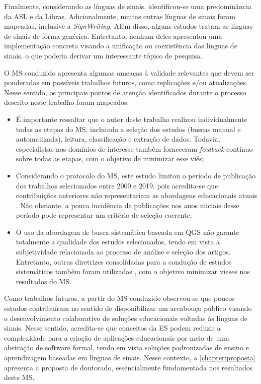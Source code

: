 Finalmente, considerando as línguas de sinais, identificou-se uma predominância da ASL e da Libras. Adicionalmente, muitas outras línguas de sinais foram mapeadas, inclusive a \textit{SignWriting}. Além disso, alguns estudos tratam as línguas de sinais de forma genérica. Entretanto, nenhum deles apresentou uma implementação concreta visando a unificação ou coexistência das línguas de sinais, o que poderia derivar um interessante tópico de pesquisa.

O MS conduzido apresenta algumas ameaças à validade relevantes que devem ser ponderadas em possíveis trabalhos futuros, como replicações e/ou atualizações. Nesse sentido, os principais pontos de atenção identificados durante o processo descrito neste trabalho foram mapeados:

\begin{itemize}
\item É importante ressaltar que o autor deste trabalho realizou individualmente todas as etapas do MS, incluindo a seleção dos estudos (buscas manual e automatizada), leitura, classificação e extração de dados. Todavia, especialistas nos domínios de interesse também forneceram \textit{feedback} contínuo sobre todas as etapas, com o objetivo de minimizar esse viés; 
\item Considerando o protocolo do MS, este estudo limitou o período de publicação dos trabalhos selecionados entre 2000 e 2019, pois acredita-se que contribuições anteriores não representariam as abordagens educacionais atuais \cite{Radermacher2013,Scatalon2019}. Não obstante, a pouca incidência de publicações nos anos iniciais desse período pode representar um critério de seleção coerente.
\item O uso da abordagem de busca sistemática baseada em QGS \cite{Zhang2011} não garante totalmente a qualidade dos estudos selecionados, tendo em vista a subjetividade relacionada ao processo de análise e seleção dos artigos. Entretanto, outras diretrizes consolidadas para a condução de estudos sistemáticos também foram utilizadas \cite{Kitchenham2007,Petersen2015}, com o objetivo minimizar vieses nos resultados do MS.
\end{itemize}

Como trabalhos futuros, a partir do MS conduzido observou-se que poucos estudos contribuíram no sentido de disponibilizar um arcabouço público visando o desenvolvimento colaborativo de soluções educacionais voltadas às línguas de sinais. Nesse sentido, acredita-se que conceitos da ES podem reduzir a complexidade para a criação de aplicações educacionais por meio de uma abstração de software formal, tendo em vista soluções padronizadas de ensino e aprendizagem baseadas em línguas de sinais. Nesse contexto, a \autoref{chapter:proposta} apresenta a proposta de doutorado, essencialmente fundamentada nos resultados deste MS.
